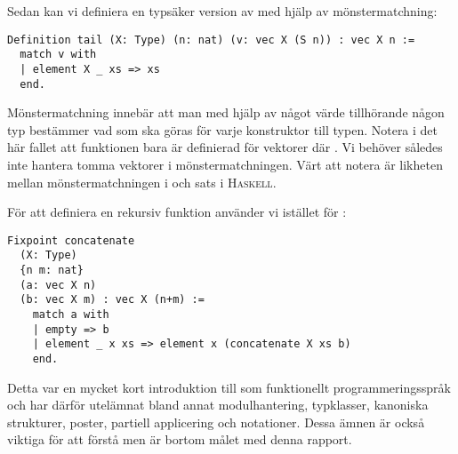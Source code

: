Sedan kan vi definiera en typsäker version av  med hjälp av
mönstermatchning:
\begin{lstlisting}
Definition tail (X: Type) (n: nat) (v: vec X (S n)) : vec X n :=
  match v with
  | element X _ xs => xs
  end.
\end{lstlisting}
Mönstermatchning innebär att man med hjälp av något värde tillhörande någon typ
bestämmer vad som ska göras för varje konstruktor till typen. Notera i det här
fallet att funktionen bara är definierad för vektorer  där . Vi behöver således inte hantera tomma vektorer i mönstermatchningen. Värt
att notera är likheten mellan mönstermatchningen i \coq{} och  sats i
\textsc{Haskell}.

För att definiera en rekursiv funktion använder vi  istället för
:
\begin{lstlisting}
Fixpoint concatenate
  (X: Type)
  {n m: nat}
  (a: vec X n)
  (b: vec X m) : vec X (n+m) :=
    match a with
    | empty => b
    | element _ x xs => element x (concatenate X xs b)
    end.
\end{lstlisting}

Detta var en mycket kort introduktion till \coq{} som funktionellt
programmeringsspråk och har därför utelämnat bland annat modulhantering,
typklasser, kanoniska strukturer, poster, partiell applicering och notationer.
Dessa ämnen är också viktiga för att förstå \coq{} men är bortom målet med denna
rapport.
